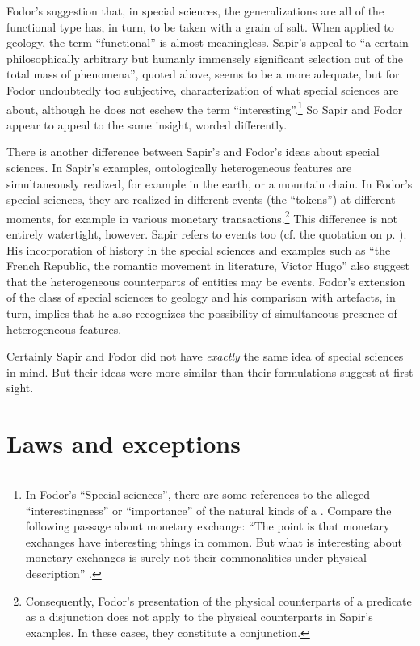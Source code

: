\documentclass[output=paper]{langscibook}
\begin{document}
Fodor's suggestion that, in special sciences, the generalizations are all of the functional type has, in turn, to be taken with a grain of salt. When applied to geology, the term ``functional'' is almost meaningless. Sapir's appeal to ``a certain philosophically arbitrary but humanly immensely significant selection out of the total mass of phenomena'', quoted above, seems to be a more adequate, but for Fodor undoubtedly too subjective, characterization of what special sciences are about, although he does not eschew the term ``interesting''.\footnote{In Fodor's ``Special sciences'', there are some references to the alleged ``interestingness'' or ``importance'' of the natural kinds of a . Compare the following passage about monetary exchange: ``The point is that monetary exchanges have interesting things in common. But what is interesting about monetary exchanges is surely not their commonalities under physical description'' \citep[103--104]{Fodor1974}.} So Sapir and Fodor appear to appeal to the same insight, worded differently.


\largerpage
There is another difference between Sapir's and Fodor's ideas about special sciences. In Sapir's examples, ontologically heterogeneous features are simultaneously realized, for example in the earth, or a mountain chain. In Fodor's special sciences, they are realized in different events (the ``tokens'') at different moments, for example in various monetary transactions.\footnote{Consequently, Fodor's presentation of the physical counterparts of a  predicate as a disjunction does not apply to the physical counterparts in Sapir's examples. In these cases, they constitute a conjunction.} This difference is not entirely watertight, however. Sapir refers to events too (cf. the quotation on p. \pageref{q:elffers:sapirquote}). His incorporation of history in the special sciences and examples such as ``the French Republic, the romantic movement in literature, Victor Hugo'' also suggest that the heterogeneous counterparts of  entities may be events. Fodor's extension of the class of special sciences to geology and his comparison with artefacts, in turn, implies that he also recognizes the possibility of simultaneous presence of heterogeneous features.

Certainly Sapir and Fodor did not have \emph{exactly} the same idea of special sciences in mind. But their ideas were more similar than their formulations suggest at first sight.

\section{Laws and exceptions}
\label{sec:elffers:lawsexceptions}
\end{document}
